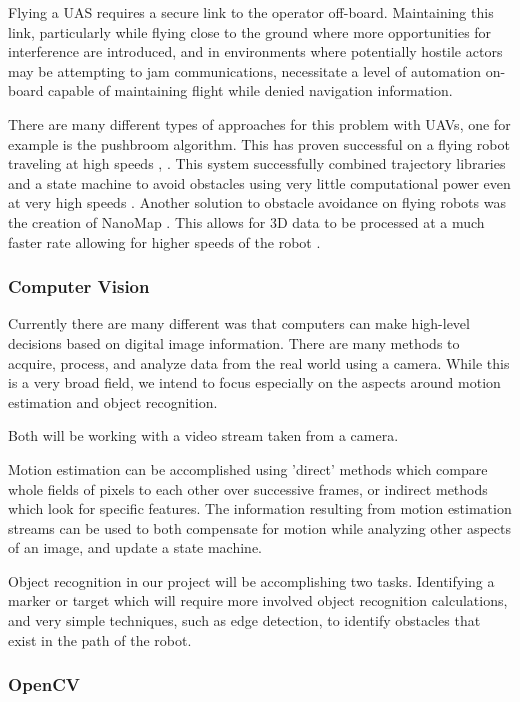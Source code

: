 \documentclass{article}
\begin{document}
		Flying a UAS requires a secure link to the operator off-board. Maintaining this link, particularly while flying close to the ground where more opportunities for interference are introduced, and in environments where potentially hostile actors may be attempting to jam communications, necessitate a level of automation on-board capable of maintaining flight while denied navigation information.
		
		There are many different types of approaches for this problem with UAVs, one for example is the pushbroom algorithm. This has proven successful on a flying robot traveling at high speeds \cite{barry2018high}, \cite{barry2015pushbroom}. This system successfully combined trajectory libraries and a state machine to avoid obstacles using very little computational power even at very high speeds \cite{barry2018high}. Another solution to obstacle avoidance on flying robots was the creation of NanoMap \cite{2018nanomap}. This allows for 3D data to be processed at a much faster rate allowing for higher speeds of the robot \cite{2018nanomap}.
		
		\subsubsection{Computer Vision}
		
		Currently there are many different was that computers can make high-level decisions based on digital image information. There are many methods to acquire, process, and analyze data from the real world using a camera. While this is a very broad field, we intend to focus especially on the aspects around motion estimation and object recognition.
		
		Both will be working with a video stream taken from a camera. 
		
		Motion estimation can be accomplished using 'direct' methods which compare whole fields of pixels to each other over successive frames, or indirect methods which look for specific features. The information resulting from motion estimation streams can be used to both compensate for motion while analyzing other aspects of an image, and update a state machine.
		
		Object recognition in our project will be accomplishing two tasks. Identifying a marker or target which will require more involved object recognition calculations, and very simple techniques, such as edge detection, to identify obstacles that exist in the path of the robot.
		
		\subsubsection{OpenCV}
		
\end{document}
